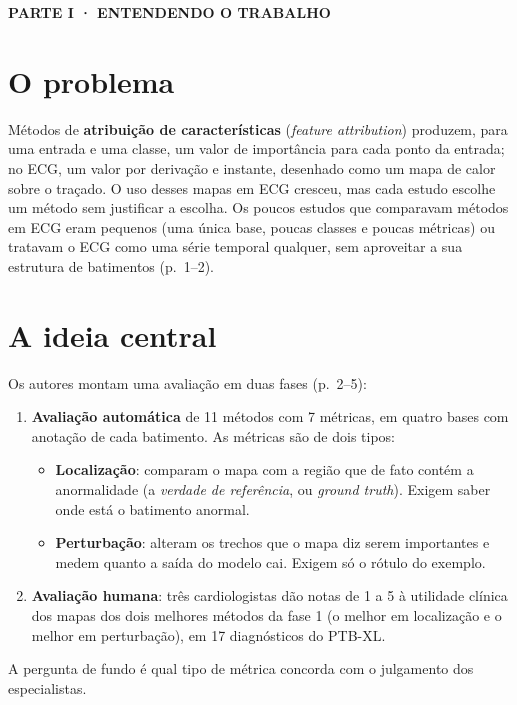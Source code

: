 \documentclass[11pt,a4paper]{article}
\newcommand{\partbar}[1]{\par\vspace{1.2em}\noindent\colorbox{black!80}{\parbox{\dimexpr\linewidth-2\fboxsep}{\color{white}\bfseries\sffamily\MakeUppercase{#1}}}\par\vspace{0.4em}}
\begin{document}
\partbar{Parte I · Entendendo o trabalho}

\section{O problema}
Métodos de \textbf{atribuição de características} (\textit{feature attribution}) produzem, para uma entrada e uma classe, um valor de importância para cada ponto da entrada; no ECG, um valor por derivação e instante, desenhado como um mapa de calor sobre o traçado. O uso desses mapas em ECG cresceu, mas cada estudo escolhe um método sem justificar a escolha. Os poucos estudos que comparavam métodos em ECG eram pequenos (uma única base, poucas classes e poucas métricas) ou tratavam o ECG como uma série temporal qualquer, sem aproveitar a sua estrutura de batimentos (p.~1--2).

\section{A ideia central}
Os autores montam uma avaliação em duas fases (p.~2--5):
\begin{enumerate}
\item \textbf{Avaliação automática} de 11 métodos com 7 métricas, em quatro bases com anotação de cada batimento. As métricas são de dois tipos:
  \begin{itemize}
  \item \textbf{Localização}: comparam o mapa com a região que de fato contém a anormalidade (a \textit{verdade de referência}, ou \textit{ground truth}). Exigem saber onde está o batimento anormal.
  \item \textbf{Perturbação}: alteram os trechos que o mapa diz serem importantes e medem quanto a saída do modelo cai. Exigem só o rótulo do exemplo.
  \end{itemize}
\item \textbf{Avaliação humana}: três cardiologistas dão notas de 1 a 5 à utilidade clínica dos mapas dos dois melhores métodos da fase 1 (o melhor em localização e o melhor em perturbação), em 17 diagnósticos do PTB-XL.
\end{enumerate}
A pergunta de fundo é qual tipo de métrica concorda com o julgamento dos especialistas.
\end{document}

